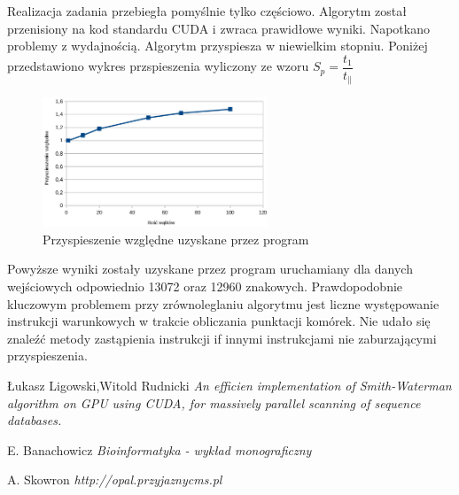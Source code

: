 \documentclass[a4paper,12pt]{article}
\begin{document}
Realizacja zadania przebiegła pomyślnie tylko częściowo. Algorytm został przenisiony na kod standardu CUDA i zwraca prawidłowe wyniki. Napotkano problemy z wydajnością. Algorytm przyspiesza w niewielkim stopniu. Poniżej przedstawiono wykres przspieszenia wyliczony ze wzoru $S_{p} = \dfrac{t_{1}}{t_{\parallel}}$

\begin{figure}[H]
  \vspace{5pt}
  \centering
  \begin{center}
  \includegraphics[width=0.6\textwidth]{images/wykres.png}
  \end{center}
  \caption{Przyspieszenie względne uzyskane przez program}
 \end{figure}
 
 
 Powyższe wyniki zostały uzyskane przez program uruchamiany dla danych wejściowych odpowiednio 13072 oraz 12960 znakowych. Prawdopodobnie kluczowym problemem przy zrównoleglaniu algorytmu jest liczne występowanie instrukcji warunkowych w trakcie obliczania punktacji komórek. Nie udało się znaleźć metody zastąpienia instrukcji if innymi instrukcjami nie zaburzającymi przyspieszenia.


\begin{thebibliography}{9}

  Łukasz Ligowski,Witold Rudnicki
  \emph{An efficien implementation of Smith-Waterman algorithm on GPU using CUDA, for massively parallel scanning of sequence databases.}
  
  E. Banachowicz
  \emph{Bioinformatyka - wykład monograficzny}
  
  A. Skowron
  \emph{http://opal.przyjaznycms.pl}


\end{thebibliography}
\end{document}
